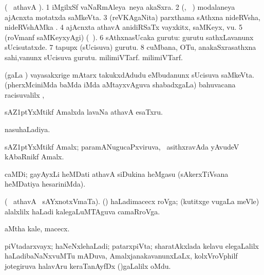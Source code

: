 \bentry 
{}  
\gl{\nA} 
\bmng
(\bava\  athavA ). 
\bnum
\num{1} iMgilxSf vaNaRmAleya \,neya akaSxra. 
\num{2} (\biVga, \sA\ ) modalaneya ajAcnxta motatxda saMkeVta. 
\num{3} (reVKAgaNita) parxthama sAthxna nideRVsha, nideRVshAMka .  
\num{4} ajAcnxta athavA anidiRSaTx vayxkitx, saMKeyx, \mo vu. 
\num{5} (roVmanf saMKeyxyAgi)  (\udA\ ).   
\num{6} sAthxnasUcaka gurutu:   \; gurutu sathxLavanunx sUcisutatxde. 
\num{7} tapupx (sUcisuva) gurutu. 
\num{8} cuMbana, OTu, anakaSxrasathxna sahi,\mo vanunx sUcisuva gurutu.  milimiVTarf.  milimiVTarf.
\enum
\emng
\eentry

\bentry
{} 
\gl{\saMkeV} 
\bmng
(\caci gaLa \vi) vayasakxrige mAtarx takukxdAdudu eMbudanunx  sUcisuva saMkeVta.
\emng
\eentry
\bentry
{} 
\gl{\uparx} 
\bmng
(pherxMciniMda baMda  iMda  aMtayxvAguva shabadxgaLa) bahuvacana racisuvalilx \parx, \udA\  
\emng 
\eentry

\bentry
{} 
\gl{\nA} 
\bmng
sAZ\kern1ptYxMtikf Amalxda lavaNa athavA esaTxru.
\emng
\eentry

\bentry
{} 
\gl{\gu} 
\bmng
nasuhaLadiya.
\emng  
\eentry

\bentry
{} 
\gl{\nA} 
\bmng
sAZ\kern1ptYxMtikf Amalx;  paramANugucaPxviruva, \sA\  asithxravAda yAvudeV kAbaRnikf Amalx.
\emng
\eentry

\bentry
{} 
\gl{\nA}
\bmng
caMDi; gayAyxLi heMDati athavA siDukina heMgasu (sAkerxTiVsana heMDatiya hesariniMda).
\emng
\eentry

\bentry
{}
\gl{\nA} 
\bmng
(\bava\  athavA  \ucAcx\ sAYxnotxVmaTa). ({\roVshA})
\banum
{}  haLadimacecx roVga; (kutitxge \mo vugaLa meVle) alalxlilx haLadi kalegaLuMTAguva camaRroVga.
 
 aMtha kale, macecx.
\eanum
\emng
\eentry

\bentry
{} 
\gl{\nA}
\bmng
piVtadarxvayx; haNeNxlehaLadi; patarxpiVta; sharatAkxlada kelavu elegaLalilx  haLadibaNaNxvuMTu mADuva,  AmalxjanakavanunxLaLx, kolxVroVphilf jotegiruva halavAru keraTanAyfDx ()gaLalilx oMdu.
\emng  
\eentry

